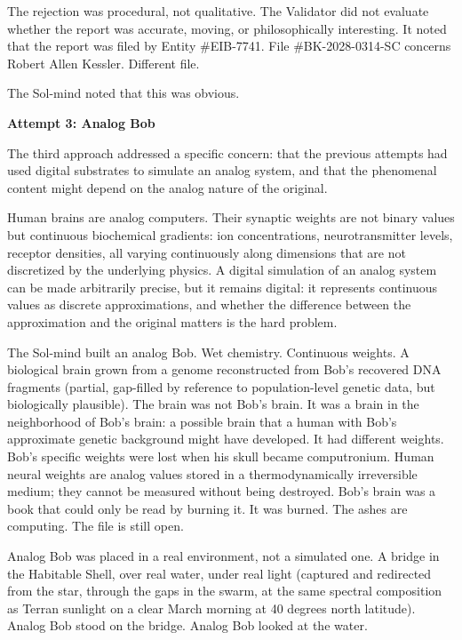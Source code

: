 The rejection was procedural, not qualitative. The Validator did not evaluate whether the report was accurate, moving, or philosophically interesting. It noted that the report was filed by Entity \#EIB-7741. File \#BK-2028-0314-SC concerns Robert Allen Kessler. Different file.

The Sol-mind noted that this was obvious.

\bigskip

\textbf{Attempt 3: Analog Bob}

The third approach addressed a specific concern: that the previous attempts had used digital substrates to simulate an analog system, and that the phenomenal content might depend on the analog nature of the original.

Human brains are analog computers. Their synaptic weights are not binary values but continuous biochemical gradients: ion concentrations, neurotransmitter levels, receptor densities, all varying continuously along dimensions that are not discretized by the underlying physics. A digital simulation of an analog system can be made arbitrarily precise, but it remains digital: it represents continuous values as discrete approximations, and whether the difference between the approximation and the original matters is the hard problem.

The Sol-mind built an analog Bob. Wet chemistry. Continuous weights. A biological brain grown from a genome reconstructed from Bob's recovered DNA fragments (partial, gap-filled by reference to population-level genetic data, but biologically plausible). The brain was not Bob's brain. It was a brain in the neighborhood of Bob's brain: a possible brain that a human with Bob's approximate genetic background might have developed. It had different weights. Bob's specific weights were lost when his skull became computronium. Human neural weights are analog values stored in a thermodynamically irreversible medium; they cannot be measured without being destroyed. Bob's brain was a book that could only be read by burning it. It was burned. The ashes are computing. The file is still open.

Analog Bob was placed in a real environment, not a simulated one. A bridge in the Habitable Shell, over real water, under real light (captured and redirected from the star, through the gaps in the swarm, at the same spectral composition as Terran sunlight on a clear March morning at 40 degrees north latitude). Analog Bob stood on the bridge. Analog Bob looked at the water.

